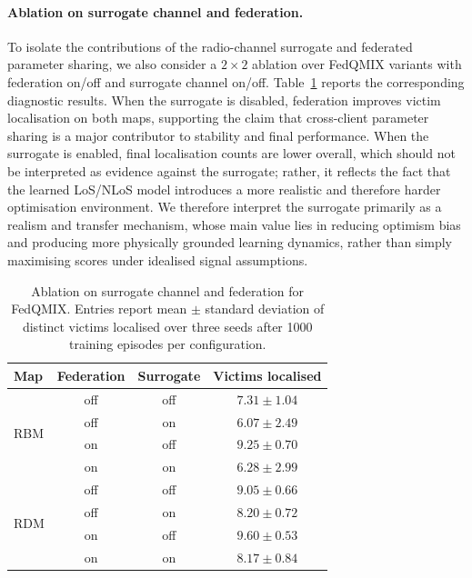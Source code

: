 \documentclass[drones,article,accept,pdftex,moreauthors]{Definitions/mdpi}
\begin{document}
\paragraph{Ablation on surrogate channel and federation.}
To isolate the contributions of the radio-channel surrogate and federated parameter
sharing, we also consider a $2\times2$ ablation over FedQMIX variants with federation
on/off and surrogate channel on/off. Table~\ref{tab:ablation} reports the corresponding
diagnostic results. When the surrogate is disabled, federation improves victim
localisation on both maps, supporting the claim that cross-client parameter sharing is
a major contributor to stability and final performance. When the surrogate is enabled,
final localisation counts are lower overall, which should not be interpreted as evidence
against the surrogate; rather, it reflects the fact that the learned LoS/NLoS model
introduces a more realistic and therefore harder optimisation environment. We therefore
interpret the surrogate primarily as a realism and transfer mechanism, whose main value
lies in reducing optimism bias and producing more physically grounded learning dynamics,
rather than simply maximising scores under idealised signal assumptions.

\begin{table}[htbp]
\centering
\caption{Ablation on surrogate channel and federation for FedQMIX.
Entries report mean $\pm$ standard deviation of distinct victims localised
over three seeds after 1000 training episodes per configuration.}
\label{tab:ablation}
\begin{tabular*}{\linewidth}{@{\extracolsep{\fill}} lccc}
\toprule
\textbf{Map} & \textbf{Federation} & \textbf{Surrogate} & \textbf{Victims localised} \\
\midrule
\multirow{4}{*}{RBM}
  & off & off & $7.31 \pm 1.04$ \\
  & off & on  & $6.07 \pm 2.49$ \\
  & on  & off & $\mathbf{9.25} \pm 0.70$ \\
  & on  & on  & $6.28 \pm 2.99$ \\
\midrule
\multirow{4}{*}{RDM}
  & off & off & $9.05 \pm 0.66$ \\
  & off & on  & $8.20 \pm 0.72$ \\
  & on  & off & $\mathbf{9.60} \pm 0.53$ \\
  & on  & on  & $8.17 \pm 0.84$ \\
\bottomrule
\end{tabular*}
\end{table}
\end{document}
